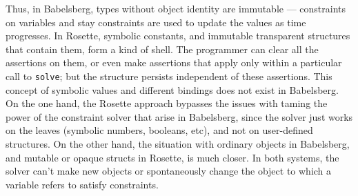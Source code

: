 \documentclass[reprint]{sigplanconf}
\begin{document}
Thus, in Babelsberg, types without object identity are immutable ---
constraints on variables and stay constraints are used to update the values
as time progresses.  In Rosette, symbolic constants, and immutable
transparent structures that contain them, form a kind of shell.  The
programmer can clear all the assertions on them, or even make assertions
that apply only within a particular call to \verb|solve|; but the structure
persists independent of these assertions.
This concept of symbolic
values and different bindings does not exist in Babelsberg.  On the one
hand, the Rosette approach bypasses the issues with taming the power of the
constraint solver that arise in Babelsberg, since the solver just works on
the leaves (symbolic numbers, booleans, etc), and not on user-defined
structures.  On the other hand, the situation with ordinary objects in
Babelsberg, and mutable or opaque structs in Rosette, is much closer.  In
both systems, the solver can't make new objects or spontaneously change the
object to which a variable refers to satisfy constraints.




\end{document}
